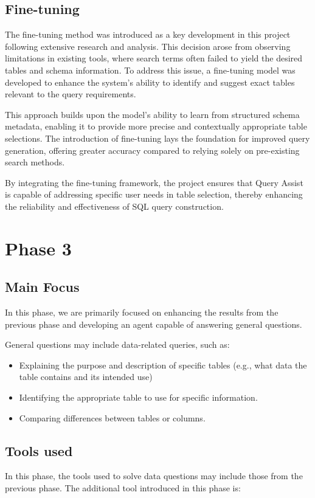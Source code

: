     \subsection{Fine-tuning}
    The fine-tuning method was introduced as a key development in this project following extensive research and analysis. This decision arose from observing limitations in existing tools, where search terms often failed to yield the desired tables and schema information. To address this issue, a fine-tuning model was developed to enhance the system’s ability to identify and suggest exact tables relevant to the query requirements.

    This approach builds upon the model's ability to learn from structured schema metadata, enabling it to provide more precise and contextually appropriate table selections. The introduction of fine-tuning lays the foundation for improved query generation, offering greater accuracy compared to relying solely on pre-existing search methods.

    By integrating the fine-tuning framework, the project ensures that Query Assist is capable of addressing specific user needs in table selection, thereby enhancing the reliability and effectiveness of SQL query construction.

\section{Phase 3}
    \subsection{Main Focus}
    In this phase, we are primarily focused on enhancing the results from the previous phase and developing an agent capable of answering general questions.

    General questions may include data-related queries, such as:
    \begin{itemize}
      \item Explaining the purpose and description of specific tables (e.g., what data the table contains and its intended use)
      \item Identifying the appropriate table to use for specific information.
      \item Comparing differences between tables or columns.
    \end{itemize}

    \subsection{Tools used}
    In this phase, the tools used to solve data questions may include those from the previous phase. The additional tool introduced in this phase is:

